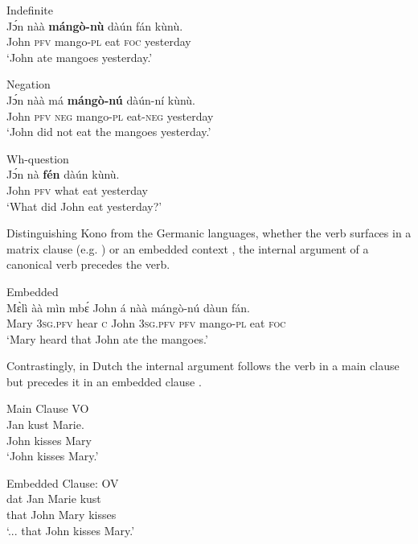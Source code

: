 \documentclass[output=paper,colorlinks,citecolor=brown,draftmode
]{langscibook}
\begin{document}
\ea \label{ex:Kono: Consistent OV}
\begin{xlist}

\ex \label{ex:Kono:indefinite}
Indefinite \\
\gll Jɔ́n nàà \textbf{mángò-nù} dàún fán kùnù. \\
John \textsc{pfv} mango-\textsc{pl} eat \textsc{foc} yesterday \\
\glt `John ate mangoes yesterday.'

\ex \label{ex:Kono:negation}
Negation \\
\gll Jɔ́n nàà má \textbf{mángò-nú} dàún-ní kùnù. \\
John \textsc{pfv} \textsc{neg} mango-\textsc{pl} eat-\textsc{neg} yesterday \\
\glt `John did not eat the mangoes yesterday.'

\newpage %
\ex \label{ex:Kono:WH}
Wh-question \\
\gll Jɔ́n  nà \textbf{fén} 	 	dàún	kùnù.  \\
John \textsc{pfv} what eat yesterday\\
\glt `What did John eat yesterday?'

\end{xlist}
\z 

Distinguishing Kono from the Germanic languages, whether the verb surfaces in a matrix clause (e.g. ) or an embedded context , the internal argument of a canonical verb precedes the verb. 


\ea \label{ex:Kono: Embedded}
Embedded \\
\gll Mɛ̀lì àà mìn mbɛ́ John  á nàà  mángò-nú dàun fán. \\
Mary \textsc{3sg.pfv} hear \textsc{c} John \textsc{3sg.pfv}	\textsc{pfv} mango-\textsc{pl} eat \textsc{foc} \\
\glt `Mary heard that John ate the mangoes.'
\z


Contrastingly, in Dutch the internal argument follows the verb in a main clause  but precedes it in an embedded clause .


\ea \label{ex:Dutch}
\begin{xlist}

\ex \label{ex:Dutch:VO}
Main Clause VO \citep[22]{zwart2012morphosyntax} \\
\gll Jan kust Marie. \\
John kisses Mary \\
\glt `John kisses Mary.'

\ex \label{ex:Dutch:OV}
Embedded Clause: OV \citep[24]{zwart2012morphosyntax} \\
\gll dat Jan Marie kust \\
that John Mary kisses  \\
\glt `... that John kisses Mary.'

\end{xlist}
\z 
\end{document}
